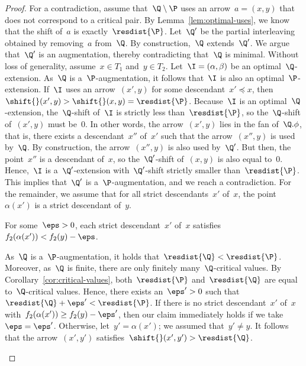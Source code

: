\begin{proof}
    For a contradiction, assume that~$\Q \setminus \P$ uses an arrow~$a = (x, y)$ that does not correspond to a critical pair.
    By Lemma~\ref{lem:optimal-uses}, we know that the shift of~$a$ is exactly~$\resdist{\P}$.
    Let~$\Q'$ be the partial interleaving obtained by removing~$a$ from~$\Q$.
    By construction,~$\Q$ extends~$\Q'$.
    We argue that~$\Q'$ is an augmentation, thereby contradicting that~$\Q$ is minimal.
    Without loss of generality, assume~$x \in T_1$ and~$y \in T_2$.    
    Let~$\I = (\alpha, \beta)$ be an optimal~$\Q$-extension.
    As~$\Q$ is a~$\P$-augmentation, it follows that~$\I$ is also an optimal~$\P$-extension.
%
    If~$\I$ uses an arrow~$(x', y)$ for some descendant~$x'\preceq x$, then~$\shift{}(x', y) > \shift{}(x, y) = \resdist{\P}$.
    Because~$\I$ is an optimal~$\Q$-extension, the~$\Q$-shift of~$\I$ is strictly less than~$\resdist{\P}$, so the~$\Q$-shift of~$(x', y)$ must be~$0$.
    In other words, the arrow~$(x', y)$ lies in the fan of~$\Q.\phi$, that is, there exists a descendant~$x''$ of~$x'$ such that the arrow~$(x'', y)$ is used by~$\Q$.
    By construction, the arrow~$(x'', y)$ is also used by~$\Q'$.
    But then, the point~$x''$ is a descendant of~$x$, so the~$\Q'$-shift of~$(x, y)$ is also equal to~$0$.
    Hence,~$\I$ is a~$\Q'$-extension with~$\Q'$-shift strictly smaller than~$\resdist{\P}$.
    This implies that~$\Q'$ is a~$\P$-augmentation, and we reach a contradiction.
    For the remainder, we assume that for all strict descendants~$x'$ of~$x$, the point~$\alpha(x')$ is a strict descendant of~$y$.
%
    \begin{claim}\label{claim:A}
        For some~$\eps > 0$, each strict descendant~$x'$ of~$x$ satisfies~$f_2(\alpha(x')) < f_2(y) - \eps$.
    \end{claim}
    \begin{claimproof}
    As~$\Q$ is a~$\P$-augmentation, it holds that~$\resdist{\Q} < \resdist{\P}$.
    Moreover, as~$\Q$ is finite, there are only finitely many~$\Q$-critical values.
    By Corollary~\ref{cor:critical-values}, both~$\resdist{\P}$ and~$\resdist{\Q}$ are equal to~$\Q$-critical values.
    Hence, there exists an~$\eps' > 0$ such that~$\resdist{\Q} + \eps' < \resdist{\P}$.
    If there is no strict descendant~$x'$ of~$x$ with~$f_2(\alpha(x')) \ge f_2(y) - \eps'$, then our claim immediately holds if we take~$\eps = \eps'$.
    Otherwise, let~$y' = \alpha(x')$; we assumed that~$y' \neq y$.
    It follows that the arrow~$(x', y')$ satisfies~$\shift{}(x', y') > \resdist{\Q}$.

\end{claimproof}
\end{proof}

